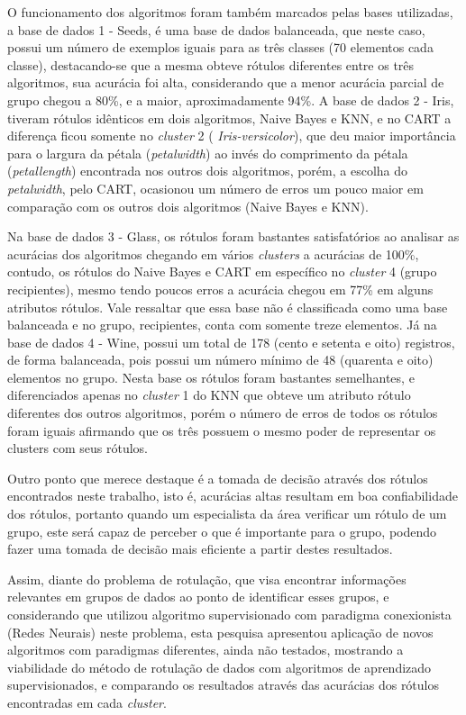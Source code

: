 O funcionamento dos algoritmos foram também  marcados pelas bases utilizadas, a base de dados 1 - Seeds, é uma base de dados balanceada, que neste caso, possui um número de exemplos iguais para as três classes (70 elementos cada classe), destacando-se que a mesma obteve rótulos diferentes entre os três algoritmos, sua acurácia foi alta, considerando que a menor acurácia parcial de grupo chegou a 80\%, e a maior, aproximadamente 94\%. A base de dados 2 - Iris, tiveram rótulos idênticos em dois algoritmos, Naive Bayes e KNN, e no CART a diferença ficou somente no \textit{cluster} 2 ( \textit{Iris-versicolor}), que deu maior importância para o largura da pétala (\textit{petalwidth}) ao invés do comprimento da pétala (\textit{petallength}) encontrada nos outros dois algoritmos, porém, a escolha do \textit{petalwidth}, pelo CART, ocasionou um número de erros um pouco maior em comparação com os outros dois algoritmos (Naive Bayes e KNN). 

Na base de dados 3 - Glass, os rótulos foram bastantes satisfatórios ao  analisar as acurácias dos algoritmos chegando em vários \textit{clusters} a acurácias de 100\%, contudo, os rótulos do Naive Bayes e CART em específico no \textit{cluster} 4 (grupo recipientes), mesmo tendo poucos erros a acurácia chegou em 77\% em alguns atributos rótulos. Vale ressaltar que essa base não é classificada como uma base balanceada e no grupo, recipientes, conta com somente treze elementos. Já na base de dados 4 - Wine, possui um total de 178 (cento e setenta e oito) registros, de forma balanceada, pois possui um número mínimo de 48 (quarenta e oito) elementos no grupo. Nesta base os rótulos foram bastantes semelhantes, e diferenciados apenas no \textit{cluster} 1 do KNN que obteve um atributo rótulo diferentes dos outros algoritmos, porém o número de erros de todos os rótulos foram iguais afirmando que os três possuem o mesmo poder de representar os clusters com seus rótulos.


Outro ponto que merece destaque é a tomada de decisão através dos rótulos encontrados neste trabalho, isto é, acurácias altas resultam em boa confiabilidade dos rótulos, portanto quando um especialista da área verificar um rótulo de um grupo, este será capaz de perceber o que é importante para o grupo, podendo fazer uma tomada de decisão mais eficiente a partir destes resultados.

Assim, diante do problema de rotulação, que visa encontrar informações relevantes em grupos de dados ao ponto de identificar esses grupos, e considerando que  utilizou algoritmo supervisionado com paradigma conexionista (Redes Neurais) neste problema, esta pesquisa apresentou aplicação de novos algoritmos com paradigmas diferentes, ainda não testados, mostrando a viabilidade do método de rotulação de dados com algoritmos de aprendizado supervisionados, e comparando os resultados através das acurácias dos rótulos encontradas em cada \textit{cluster}.


